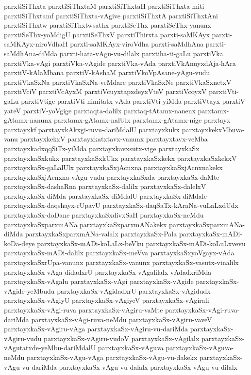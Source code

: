 {parxtiSiThxta
parxtiSiThxtaM
parxtiSiThxtaH
parxtiSiThxta-miti
parxtiSiThxtamf
parxtiSiThxta-vAgive
parxtiSiThxtA
parxtiSiThxtAni
parxtiSiThxtw
parxtiSiThxtwsathx
parxtiSeThx
parxtiSeThx-yanunx
parxtiSeThx-yoMdigU
parxtiSeThxV
parxtiThirxta
parxti-saMKAyx
parxti-saMKAyx-niroVdhaH
parxti-saMKAyx-viroVdha
parxti-saMdhAna
parxti-saMdhAna-diMda
parxti-hata-vAgu-vu-dilalx
parxtiha-ti-gaLu
parxtiVka
parxtiVka-vAgi
parxtiVka-vAgide
parxtiVka-vAda
parxtiVkAnuyxdAja-hAra
parxtiV-kAlaMbana
parxtiV-kAshaM
parxtiVkoVpAsane-yAgu-vudu
parxtiVkaSxNa
parxtiVkaSxNa-veMdare
parxtiVkaSxNe
parxtiVkaSxnetxV
parxtiVciV
parxtiVcAyxM
parxtiVcuyxtapxdeyxVteV
parxtiVcoyxV
parxtiVti-gaLu
parxtiVtige
parxtiVti-nimitatx-vAda
parxtiVti-yiMda
parxtiVtayx
parxtiV-yateV
parxtiV-yoVgige
parxtaqta-dalilx
parxtaq-tAtamx-nanenx
parxtamx-gAtamx-nanunx
parxtamx-gAtamx-nalUlx
parxtamx-gAtamx-nige
parxtayx
parxtayxkf
parxtayxkAkxgi-ruvu-dariMdalU
parxtayxkukx
parxtayxkekxMbuva-vanu
parxtayxkekxV
parxtayxkatxtavx-vanunx
parxtayxtavx-veMba
parxtayxkadxqqSiTx-yiMda
parxtayxkavxsutx-vige
parxtayxkaSx
parxtayxkaSxkukx
parxtayxkaSxkUkx
parxtayxkaSxkekx
parxtayxkaSxkekxV
parxtayxkaSx-gaLalUlx
parxtayxkaSxjAcnxna
parxtayxkaSxjAcnxnakekx
parxtayxkaSxjAcnxna-vAgu-vudu
parxtayxkaSxda
parxtayxkaSx-daMte
parxtayxkaSx-dashaRna
parxtayxkaSx-dalilx
parxtayxkaSx-dalelxV
parxtayxkaSx-diMda
parxtayxkaSx-diMdalU
parxtayxkaSx-diMdale
parxtayxkaSx-daqshayx-rUpavU
parxtayxkaSx-daqSaTx-kAraNa-vuLaLxdUdx
parxtayxkaSx-doDane
parxtayxkaSxdivxSaH
parxtayxkaSx-neMdu
parxtayxkaSxparxmANa
parxtayxkaSxparxmANakekx
parxtayxkaSxparxmANa-diMda
parxtayxkaSxparxmANa-valalx
parxtayxkaSx-Pala
parxtayxkaSx-mADi-koDa-deye
parxtayxkaSx-mADi-koLaLx-beVku
parxtayxkaSx-mADi-koLuLxvevu
parxtayxkaSx-mADi-dalilx
parxtayxkaSx-meVva
parxtayxkaSxyoVgayx-vAda
parxtayxkaSxrUpa-vanunx
parxtayxkaSx-vanunx
parxtayxkaSx-vasutx-vinalilx
parxtayxkaSx-vAga-didadxrU
parxtayxkaSx-vAgalilalx-vAdadxriMda
parxtayxkaSx-vAgalu
parxtayxkaSx-vAgi
parxtayxkaSx-vAgide
parxtayxkaSx-vAgide-yeMbudu
parxtayxkaSx-vAgidadxrU
parxtayxkaSx-vAgidudx
parxtayxkaSx-vAgiyU
parxtayxkaSx-vAgiyeV
parxtayxkaSx-vAgirali
parxtayxkaSx-vAgi-ruva
parxtayxkaSx-vAgiru-vaMte
parxtayxkaSx-vAgi-ruva-dariMda
parxtayxkaSx-vAgi-ruva-neMdu
parxtayxkaSx-vAgiru-vaveV
parxtayxkaSx-vAgiru-vAga
parxtayxkaSx-vAgiru-vu-dariMda
parxtayxkaSx-vAgiru-vudu
parxtayxkaSx-vAgiru-vudoV
parxtayxkaSx-vAgilalx
parxtayxkaSx-vAgutatxde-yeMbu-dariMdalU
parxtayxkaSx-vAguva
parxtayxkaSx-vAguva-neMdu
parxtayxkaSx-vAgu-vAga
parxtayxkaSx-vAgu-vu-dakekx
parxtayxkaSx-vAgu-vu-dariMda
parxtayxkaSx-vAgu-vu-dalalx
parxtayxkaSx-vAgu-vu-dilalx
}
